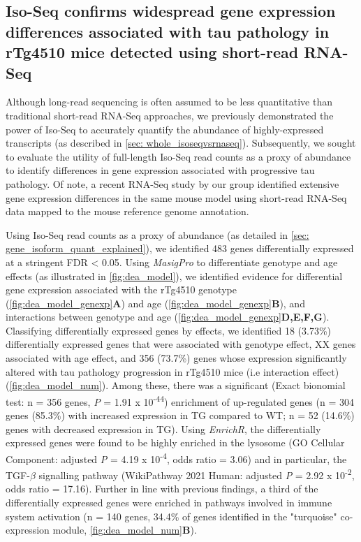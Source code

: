 \subsection{Iso-Seq confirms widespread gene expression differences associated with tau pathology in rTg4510 mice detected using short-read RNA-Seq}
\label{ch5: diffgeneexp}
Although long-read sequencing is often assumed to be less quantitative than traditional short-read RNA-Seq approaches, we previously demonstrated the power of Iso-Seq to accurately quantify the abundance of highly-expressed transcripts (as described in \cref{sec: whole_isoseqvsrnaseq}). Subsequently, we sought to evaluate the utility of full-length Iso-Seq read counts as a proxy of abundance to identify differences in gene expression associated with progressive tau pathology. Of note, a recent RNA-Seq study by our group identified extensive gene expression differences in the same mouse model using short-read RNA-Seq data mapped to the mouse reference genome annotation\cite{Castanho2020}.

Using Iso-Seq read counts as a proxy of abundance (as detailed in \cref{sec: gene_isoform_quant_explained}), we identified 483 genes differentially expressed at a stringent FDR < 0.05. Using \textit{MasigPro} to differentiate genotype and age effects (as illustrated in \cref{fig:dea_model}), we identified evidence for differential gene expression associated with the rTg4510 genotype (\cref{fig:dea_model_genexp}\textbf{A}) and age (\cref{fig:dea_model_genexp}\textbf{B}), and interactions between genotype and age (\cref{fig:dea_model_genexp}\textbf{D,E,F,G}). Classifying differentially expressed genes by effects, we identified 18 (3.73\%) differentially expressed genes that were associated with genotype effect, XX genes associated with age effect, and 356 (73.7\%) genes whose expression significantly altered with tau pathology progression in rTg4510 mice (i.e interaction effect) (\cref{fig:dea_model_num}). Among these, there was a significant (Exact bionomial test: n = 356 genes, \textit{P} = 1.91 x 10\textsuperscript{-44}) enrichment of up-regulated genes (n = 304 genes (85.3\%) with increased expression in TG compared to WT; n = 52 (14.6\%) genes with decreased expression in TG). Using \textit{EnrichR}, the differentially expressed genes were found to be highly enriched in the lysosome (GO Cellular Component: adjusted \textit{P} = 4.19 x 10\textsuperscript{-4}, odds ratio = 3.06) and in particular, the TGF-$\beta$  signalling pathway (WikiPathway 2021 Human: adjusted \textit{P} = 2.92 x 10\textsuperscript{-2}, odds ratio = 17.16). Further in line with previous findings, a third of the differentially expressed genes were enriched in pathways involved in immune system activation (n = 140 genes, 34.4\% of genes identified in the "turquoise" co-expression module\cite{Castanho2020}, \cref{fig:dea_model_num}\textbf{B}). 

